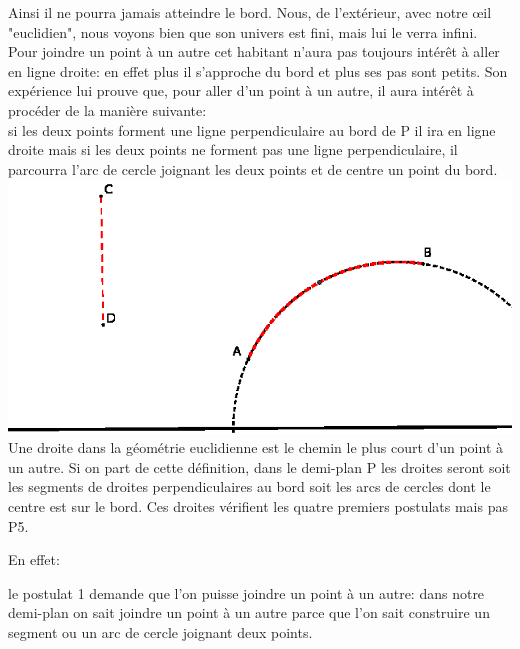 \documentclass[a4paper, 12pt, twoside]{book}
\begin{document}
        Ainsi il ne pourra jamais atteindre le bord. Nous, de l'extérieur, avec notre œil "euclidien", nous voyons bien que son univers est fini, mais lui le verra infini.\\
     
      Pour joindre un point à un autre cet habitant n'aura pas  toujours intérêt à aller en ligne droite: en effet plus il s'approche du bord et plus ses pas sont petits. Son expérience lui prouve que, pour aller d'un point à un autre, il aura intérêt à procéder de la manière suivante:\\
    
 
 



     
     si les deux points forment une ligne perpendiculaire au bord de P il ira en ligne droite mais si les deux points ne forment pas une ligne perpendiculaire, il parcourra l'arc de cercle joignant les deux points et de centre un point du bord.\\


     \includegraphics[scale=1]{figures/poinc1.eps}   \\
     
    
     Une droite dans la géométrie euclidienne est le chemin le plus court d'un point à un autre. Si on part de cette définition, dans le demi-plan P les droites seront soit les segments de droites perpendiculaires au bord soit les arcs de cercles  dont le centre est sur le bord. Ces droites vérifient les quatre premiers postulats mais pas P5. 

 
    En effet:
     
    le postulat 1 demande que l'on puisse joindre un point à un autre: dans notre demi-plan on sait joindre un point à un autre parce que l'on sait construire un segment ou un arc de cercle joignant deux points.\\
    
\end{document}
